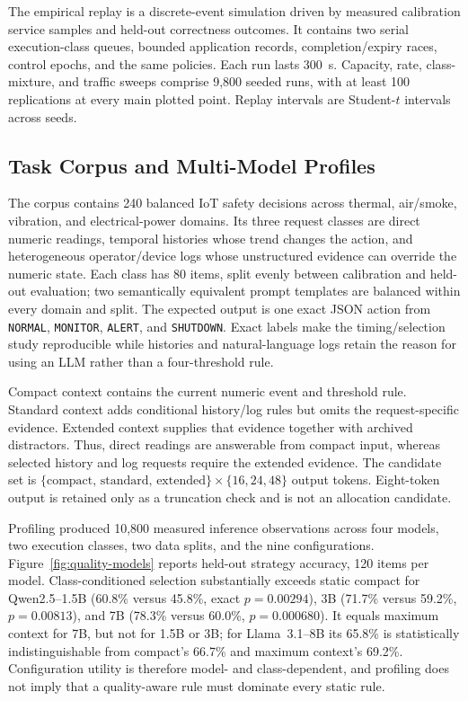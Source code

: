 \documentclass[journal]{IEEEtran}
\begin{document}
The empirical replay is a discrete-event simulation driven by measured calibration service samples and held-out correctness outcomes. It contains two serial execution-class queues, bounded application records, completion/expiry races, control epochs, and the same policies. Each run lasts 300~s. Capacity, rate, class-mixture, and traffic sweeps comprise 9,800 seeded runs, with at least 100 replications at every main plotted point. Replay intervals are Student-$t$ intervals across seeds.

\subsection{Task Corpus and Multi-Model Profiles}

The corpus contains 240 balanced IoT safety decisions across thermal, air/smoke, vibration, and electrical-power domains. Its three request classes are direct numeric readings, temporal histories whose trend changes the action, and heterogeneous operator/device logs whose unstructured evidence can override the numeric state. Each class has 80 items, split evenly between calibration and held-out evaluation; two semantically equivalent prompt templates are balanced within every domain and split. The expected output is one exact JSON action from \texttt{NORMAL}, \texttt{MONITOR}, \texttt{ALERT}, and \texttt{SHUTDOWN}. Exact labels make the timing/selection study reproducible while histories and natural-language logs retain the reason for using an LLM rather than a four-threshold rule.

Compact context contains the current numeric event and threshold rule. Standard context adds conditional history/log rules but omits the request-specific evidence. Extended context supplies that evidence together with archived distractors. Thus, direct readings are answerable from compact input, whereas selected history and log requests require the extended evidence. The candidate set is $\{\text{compact, standard, extended}\}\times\{16,24,48\}$ output tokens. Eight-token output is retained only as a truncation check and is not an allocation candidate.

Profiling produced 10,800 measured inference observations across four models, two execution classes, two data splits, and the nine configurations. Figure~\ref{fig:quality-models} reports held-out strategy accuracy, 120 items per model. Class-conditioned selection substantially exceeds static compact for Qwen2.5--1.5B (60.8\% versus 45.8\%, exact $p=0.00294$), 3B (71.7\% versus 59.2\%, $p=0.00813$), and 7B (78.3\% versus 60.0\%, $p=0.000680$). It equals maximum context for 7B, but not for 1.5B or 3B; for Llama~3.1--8B its 65.8\% is statistically indistinguishable from compact's 66.7\% and maximum context's 69.2\%. Configuration utility is therefore model- and class-dependent, and profiling does not imply that a quality-aware rule must dominate every static rule.
\end{document}
